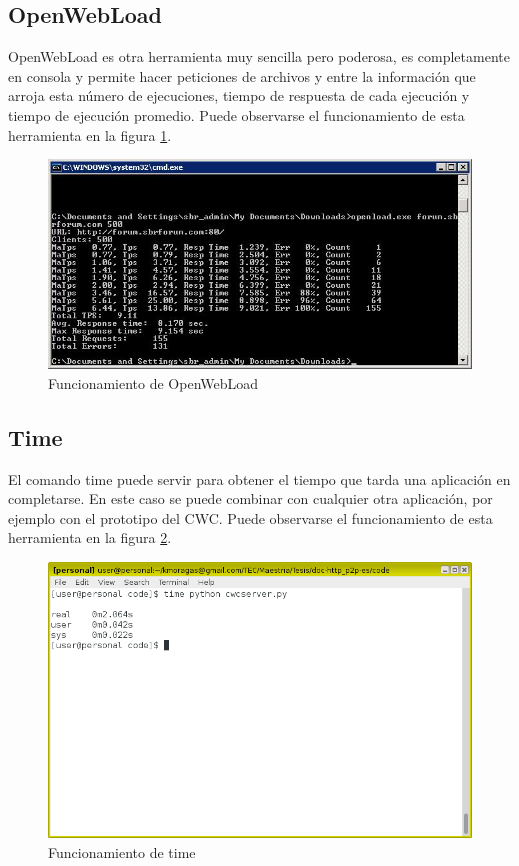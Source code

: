 \subsection{OpenWebLoad}
OpenWebLoad es otra herramienta muy sencilla pero poderosa, es completamente en consola y permite hacer peticiones de archivos y entre la información que arroja esta número de ejecuciones, tiempo de respuesta de cada ejecución y tiempo de ejecución promedio. Puede observarse el funcionamiento de esta herramienta en la figura \ref{OpenWebLoad}.

\begin{figure}[h]
  \centering
    \includegraphics[scale=0.6]{gfx/OpenWebLoad}
  \caption{Funcionamiento de OpenWebLoad}
  \label{OpenWebLoad}
\end{figure}

\subsection{Time}
\label{subsec:time}
El comando time puede servir para obtener el tiempo que tarda una aplicación en completarse. En este caso se puede combinar con cualquier otra aplicación, por ejemplo con el prototipo del CWC. Puede observarse el funcionamiento de esta herramienta en la figura \ref{time}.

\begin{figure}[h]
  \centering
    \includegraphics[scale=0.6]{gfx/time}
  \caption{Funcionamiento de time}
  \label{time}
\end{figure}

